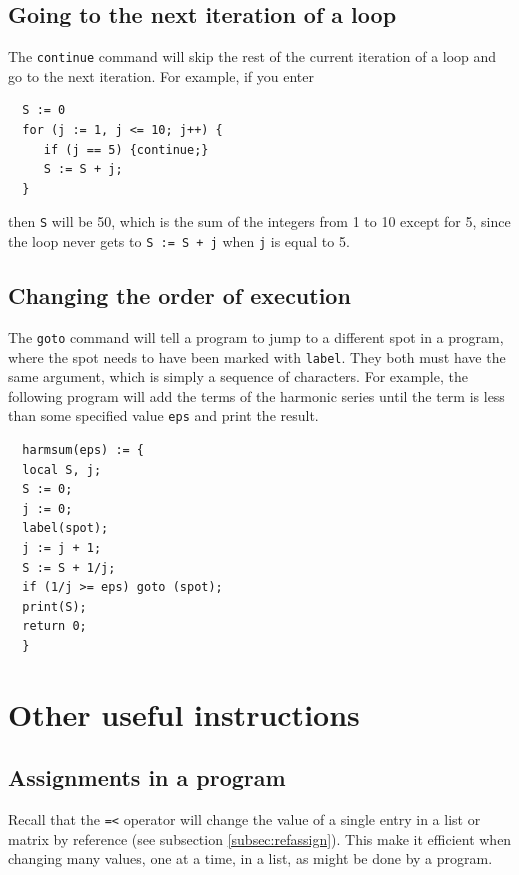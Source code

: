 \documentclass[a4paper,11pt]{book}
\begin{document}
\subsection{Going to the next iteration of a loop}

The \texttt{continue} command will skip the rest of the current
iteration of a loop and go to the next iteration.  For example,
if you enter
\begin{verbatim}
  S := 0
  for (j := 1, j <= 10; j++) {
     if (j == 5) {continue;}
     S := S + j;
  }
\end{verbatim}
then \texttt{S} will be 50, which is the sum of the integers from 1 to
10 except for 5, since the loop never gets to \texttt{S := S + j} when
\texttt{j} is equal to 5.

\subsection{Changing the order of execution}

The \texttt{goto} command will tell a program to jump to a different
spot in a program, where the spot needs to have been marked with
\texttt{label}.   They both must have the same argument, which is
simply a sequence of characters.  For example, the following program
will add the terms of the harmonic series until the term is less than
some specified value \texttt{eps} and print the result.
\begin{verbatim}
  harmsum(eps) := {
  local S, j;
  S := 0;
  j := 0;
  label(spot);
  j := j + 1;	      
  S := S + 1/j;
  if (1/j >= eps) goto (spot);
  print(S);
  return 0;
  }
\end{verbatim}

\section{Other useful instructions}

\subsection{Assignments in a program}

Recall that the \texttt{=<} operator will change the value of a single
entry in a list or matrix by reference (see subsection \ref{subsec:refassign}).
This make it efficient when changing many values, one at a time, in a
list, as might be done by a program.  
\end{document}
